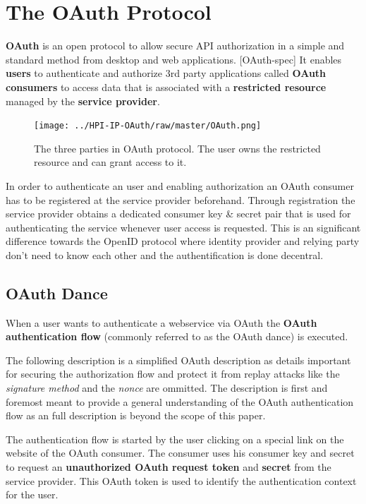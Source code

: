 \section{The OAuth Protocol}

\textbf{OAuth} is an open protocol to allow secure API
authorization in a simple and standard method from desktop and web
applications. [OAuth-spec] It enables \textbf{users} to
authenticate and authorize 3rd party applications called
\textbf{OAuth consumers} to access data that is associated with a
\textbf{restricted resource} managed by the
\textbf{service provider}.

\begin{figure}
	\centering
	\texttt{[image: ../HPI-IP-OAuth/raw/master/OAuth.png]}
	\caption{The three parties in OAuth protocol. The user owns the restricted resource and can grant access to it.}
\end{figure}

In order to authenticate an user and enabling authorization an
OAuth consumer has to be registered at the service provider
beforehand. Through registration the service provider obtains a
dedicated consumer key \& secret pair that is used for
authenticating the service whenever user access is requested. This
is an significant difference towards the OpenID protocol where
identity provider and relying party don't need to know each other
and the authentification is done decentral.

\subsection{OAuth Dance}

When a user wants to authenticate a webservice via OAuth the
\textbf{OAuth authentication flow} (commonly referred to as the
OAuth dance) is executed.

The following description is a simplified OAuth description as
details important for securing the authorization flow and protect
it from replay attacks like the \emph{signature method} and the
\emph{nonce} are ommitted. The description is first and foremost
meant to provide a general understanding of the OAuth
authentication flow as an full description is beyond the scope of
this paper.

The authentication flow is started by the user clicking on a
special link on the website of the OAuth consumer. The consumer
uses his consumer key and secret to request an
\textbf{unauthorized OAuth request token} and \textbf{secret} from
the service provider. This OAuth token is used to identify the
authentication context for the user.


